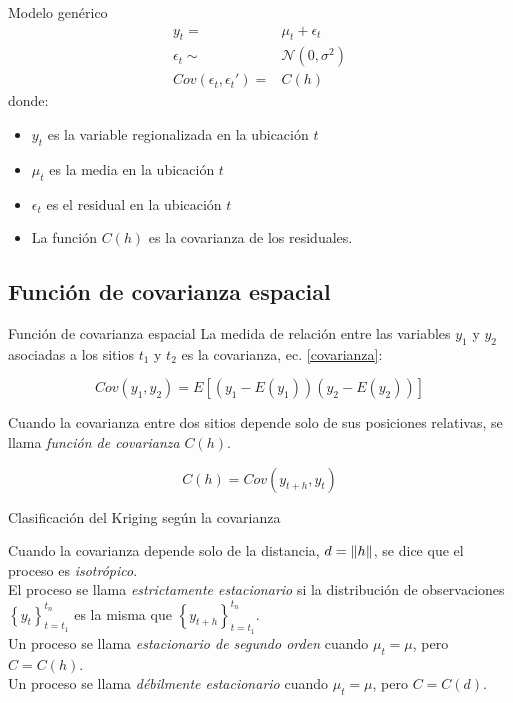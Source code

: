 \documentclass[12pts]{beamer}
\begin{document}
	\begin{frame}{Modelo genérico}
		\begin{align}
		y_t =& \mu_t +\epsilon_t\\
		\epsilon_t \sim& \mathcal{N}(0, \sigma^2)\\
		Cov(\epsilon_t, \epsilon_t') =& C(h)
		\end{align}
	donde:
	\begin{itemize}
		\item $y_t$ es la variable regionalizada en la ubicación $t$
		\item $\mu_t$ es la media en la ubicación $t$
		\item $\epsilon_t$ es el residual en la ubicación $t$ 
		\item La función $C(h)$ es la covarianza de los residuales.
	\end{itemize} 
	\end{frame}

	\subsection{Función de covarianza espacial}
	\begin{frame}{Función de covarianza espacial}
		La medida de relación entre las variables $y_1$ y $y_2$ asociadas a los sitios $t_1$ y $t_2$ es la covarianza, ec. \ref{covarianza}: 
		
		\begin{equation}
		Cov(y_1, y_2) = E\left[\left(y_1 - E(y_1)\right)\left(y_2 - E(y_2)\right)\right]\label{covarianza}
		\end{equation}
		
		Cuando la covarianza entre dos sitios depende solo de sus posiciones relativas, se llama \textit{función de covarianza} $C(h)$.
		
		\begin{equation}
		C(h) = Cov(y_{t+h}, y_t)\label{funcion_covarianza}
		\end{equation}
	\end{frame}

	\begin{frame}{Clasificación del Kriging según la covarianza}

		Cuando la covarianza depende  solo de la distancia, $d = \norm{h}$, se dice que el proceso es \textit{isotrópico}.\\[5mm]
		
		El proceso se llama \textit{estrictamente estacionario} si la distribución de observaciones $\left\lbrace y_t \right\rbrace_{t=t_1}^{t_n}$ es la misma que $\left\lbrace y_{t + h} \right\rbrace_{t=t_1}^{t_n}$.\\[5mm] 
		
		Un proceso se llama \textit{estacionario de segundo orden} cuando $\mu_t = \mu$, pero $C=C(h)$.\\[5mm]
		
		Un proceso se llama \textit{débilmente estacionario} cuando $\mu_t = \mu$, pero $C=C(d)$. 
	\end{frame}
\end{document}
